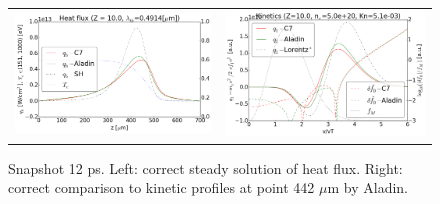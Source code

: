 \begin{figure}[tbh]
  \begin{center}
    \begin{tabular}{cc}
      \includegraphics[width=\figscale\textwidth]{../VFPdata/C7_Aladin_case3_heatflux.png} &
      \includegraphics[width=\figscale\textwidth]{../VFPdata/C7_Aladin_case3_kinetics.png}
    \end{tabular}
  \caption{  
  Snapshot 12 ps. Left: correct steady solution of heat flux. Right: correct comparison to kinetic profiles at point 442 $\mu$m by Aladin.
  }
  \end{center}
  \label{fig:C7_Aladin_case3}
\end{figure}


